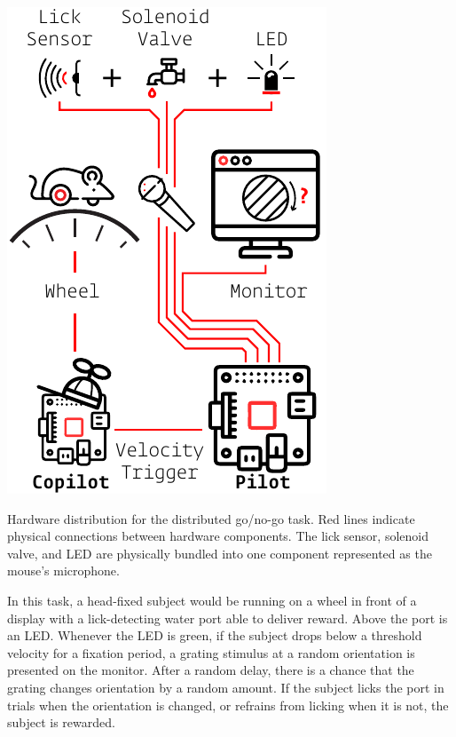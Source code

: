 \begin{marginfigure}[-0cm]
\includegraphics[]{figures/test_5_gonogo.pdf}
\caption{Hardware distribution for the distributed go/no-go task. Red lines indicate physical connections between hardware components. The lick sensor, solenoid valve, and LED are physically bundled into one component represented as the mouse's microphone.}
\label{fig:gonogo}
\end{marginfigure}

In this task, a head-fixed subject would be running on a wheel in front of a display with a lick-detecting water port able to deliver reward. Above the port is an LED. Whenever the LED is green, if the subject drops below a threshold velocity for a fixation period, a grating stimulus at a random orientation is presented on the monitor. After a random delay, there is a chance that the grating changes orientation by a random amount. If the subject licks the port in trials when the orientation is changed, or refrains from licking when it is not, the subject is rewarded. 


